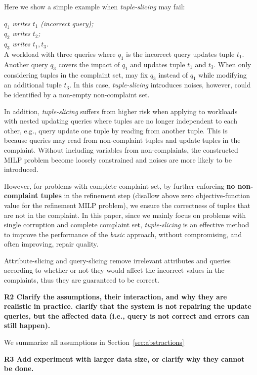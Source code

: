 Here we show a simple example when \emph{tuple-slicing} may fail:


\indent \textit{$q_1$ writes $t_1$ (incorrect query); \\
\indent $q_2$ writes $t_2$;\\
\indent $q_3$ writes $t_1, t_3$.}\\
A workload with three queries where $q_1$ is the incorrect query updates tuple $t_1$. Another query $q_3$ covers the impact of $q_1$ and updates tuple $t_1$ and $t_3$. When only considering tuples in the complaint set, \sys may fix $q_3$ instead of $q_1$ while modifying an additional tuple $t_3$. In this case, \emph{tuple-slicing} introduces noises, however, could be identified by a non-empty non-complaint set. 

In addition, \emph{tuple-slicing} suffers from higher risk when applying to workloads with nested updating queries where tuples are no longer independent to each other, e.g., query update one tuple by reading from another tuple. This is because queries may read from non-complaint tuples and update tuples in the complaint. Without including variables from non-complaints, the constructed MILP problem become loosely constrained and noises are more likely to be introduced. 
 
However, for problems with complete complaint set, by further enforcing \textbf{no non-complaint tuples} in the refinement step (disallow above zero objective-function value for the refinement MILP problem), we ensure the correctness of tuples that are not in the complaint. In this paper, since we mainly focus on problems with single corruption and complete complaint set, \emph{tuple-slicing} is an effective method to improve the performance of the \emph{basic} approach, without compromising, and often improving, repair quality.  

Attribute-slicing and query-slicing remove irrelevant attributes and queries according to whether or not they would affect the incorrect values in the complaints, thus they are guaranteed to be correct. 

\noindent \textbf{R2 Clarify the assumptions, their interaction, and why they are realistic in practice. clarify that the system is not repairing the update queries, but the affected data (i.e., query is not correct and errors can still happen).} 

We summarize all assumptions in Section~\ref{sec:abstractions} 

\noindent \textbf{R3 Add experiment with larger data size, or clarify why they cannot be done.}

